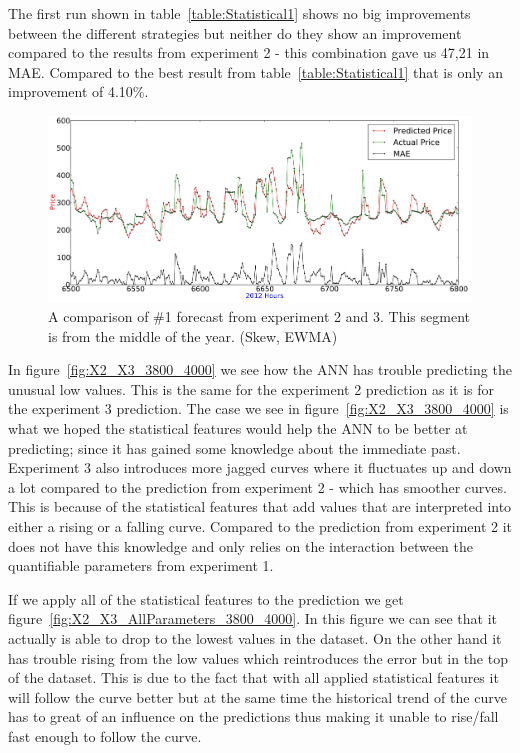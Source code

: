 The first run shown in table~\ref{table:Statistical1} shows no big improvements between the different strategies but neither do they show an improvement compared to the results from experiment 2 - this combination gave us 47,21 in MAE. Compared to the best result from table~\ref{table:Statistical1} that is only an improvement of 4.10\%.

\begin{figure}[H]
\centering
\includegraphics[width=\linewidth,natwidth=898,natheight=587]{billeder/PriceExperimentalAnalysis/X3_Nr1_Best_skew_historical.png}
\caption{A comparison of \#1 forecast from experiment 2 and 3. This segment is from the middle of the year. (Skew, EWMA)}
\label{fig:X3_Best_With_MAE}
\end{figure}

In figure~\ref{fig:X2_X3_3800_4000} we see how the ANN has trouble predicting the unusual low values. This is the same for the experiment 2 prediction as it is for the experiment 3 prediction. The case we see in figure~\ref{fig:X2_X3_3800_4000} is what we hoped the statistical features would help the ANN to be better at predicting; since it has gained some knowledge about the immediate past. Experiment 3 also introduces more jagged curves where it fluctuates up and down a lot compared to the prediction from experiment 2 - which has smoother curves. This is because of the statistical features that add values that are interpreted into either a rising or a falling curve. Compared to the prediction from experiment 2 it does not have this knowledge and only relies on the interaction between the quantifiable parameters from experiment 1.

If we apply all of the statistical features to the prediction we get figure~\ref{fig:X2_X3_AllParameters_3800_4000}. In this figure we can see that it actually is able to drop to the lowest values in the dataset. On the other hand it has trouble rising from the low values which reintroduces the error but in the top of the dataset. This is due to the fact that with all applied statistical features it will follow the curve better but at the same time the historical trend of the curve has to great of an influence on the predictions thus making it unable to rise/fall fast enough to follow the curve.

